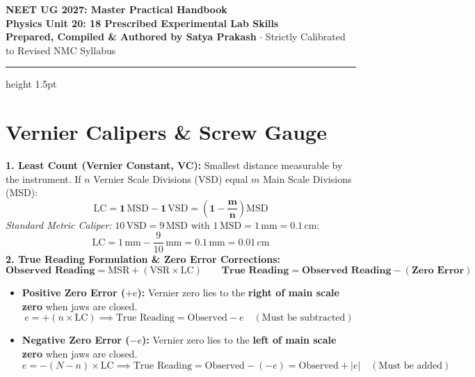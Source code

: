 \documentclass[10pt,a4paper]{article}
\begin{document}
\begin{center}
  {\Huge \textbf{NEET UG 2027: Master Practical Handbook}}\\[6pt]
  {\Large \textbf{Physics Unit 20: 18 Prescribed Experimental Lab Skills}}\\[4pt]
  {\small \textbf{Prepared, Compiled \& Authored by Satya Prakash} $\cdot$ Strictly Calibrated to Revised NMC Syllabus}
  \vspace{4pt}
  \hrule height 1.5pt
\end{center}

\pagestyle{fancy}
\fancyhf{}
\fancyfoot[C]{\thepage}

\section{Vernier Calipers \& Screw Gauge}

\begin{formulabox}
\textbf{1. Least Count (Vernier Constant, VC):}
Smallest distance measurable by the instrument. If $n$ Vernier Scale Divisions (VSD) equal $m$ Main Scale Divisions (MSD):
\begin{equation}
  \mathbf{\mathrm{LC} = 1\,\mathrm{MSD} - 1\,\mathrm{VSD} = \left(1 - \frac{m}{n}\right)\mathrm{MSD}}
\end{equation}
\textit{Standard Metric Caliper:} $10\,\mathrm{VSD} = 9\,\mathrm{MSD}$ with $1\,\mathrm{MSD} = 1\,\mathrm{mm} = 0.1\,\mathrm{cm}$:
\begin{equation}
  \mathrm{LC} = 1\,\mathrm{mm} - \frac{9}{10}\,\mathrm{mm} = \mathbf{0.1\,\mathrm{mm} = 0.01\,\mathrm{cm}}
\end{equation}
\textbf{2. True Reading Formulation \& Zero Error Corrections:}
\begin{equation}
  \mathbf{\text{Observed Reading} = \mathrm{MSR} + (\mathrm{VSR} \times \mathrm{LC})} \qquad \mathbf{\text{True Reading} = \text{Observed Reading} - (\text{Zero Error})}
\end{equation}
\begin{itemize}
  \item \textbf{Positive Zero Error ($+e$):} Vernier zero lies to the \textbf{right of main scale zero} when jaws are closed.
  \begin{equation}
    e = +(n \times \mathrm{LC}) \implies \text{True Reading} = \text{Observed} - e \quad (\text{Must be subtracted})
  \end{equation}
  \item \textbf{Negative Zero Error ($-e$):} Vernier zero lies to the \textbf{left of main scale zero} when jaws are closed.
  \begin{equation}
    e = -(N - n)\times \mathrm{LC} \implies \text{True Reading} = \text{Observed} - (-e) = \text{Observed} + |e| \quad (\text{Must be added})
  \end{equation}
\end{itemize}
\end{formulabox}
\end{document}
